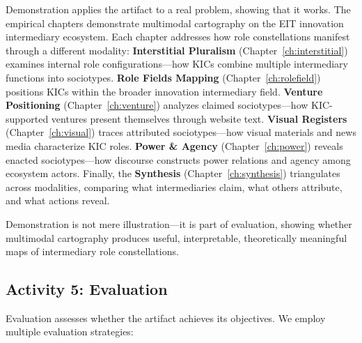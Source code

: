 \documentclass[../main.tex]{subfiles}
\begin{document}
Demonstration applies the artifact to a real problem, showing that it works. The empirical chapters demonstrate multimodal cartography on the EIT innovation intermediary ecosystem. Each chapter addresses how role constellations manifest through a different modality: \textbf{Interstitial Pluralism} (Chapter~\ref{ch:interstitial}) examines internal role configurations---how KICs combine multiple intermediary functions into sociotypes. \textbf{Role Fields Mapping} (Chapter~\ref{ch:rolefield}) positions KICs within the broader innovation intermediary field. \textbf{Venture Positioning} (Chapter~\ref{ch:venture}) analyzes claimed sociotypes---how KIC-supported ventures present themselves through website text. \textbf{Visual Registers} (Chapter~\ref{ch:visual}) traces attributed sociotypes---how visual materials and news media characterize KIC roles. \textbf{Power \& Agency} (Chapter~\ref{ch:power}) reveals enacted sociotypes---how discourse constructs power relations and agency among ecosystem actors. Finally, the \textbf{Synthesis} (Chapter~\ref{ch:synthesis}) triangulates across modalities, comparing what intermediaries claim, what others attribute, and what actions reveal.

Demonstration is not mere illustration---it is part of evaluation, showing whether multimodal cartography produces useful, interpretable, theoretically meaningful maps of intermediary role constellations.

\subsection{Activity 5: Evaluation}

Evaluation assesses whether the artifact achieves its objectives. We employ multiple evaluation strategies:
\end{document}
